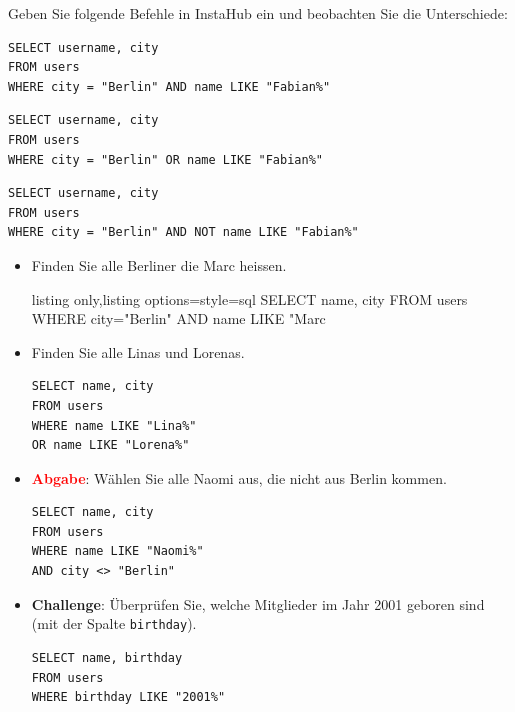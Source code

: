 \begin{myexample}
Geben Sie folgende Befehle in InstaHub ein und beobachten Sie die Unterschiede:

\begin{lstlisting}[style=sql]
SELECT username, city 
FROM users 
WHERE city = "Berlin" AND name LIKE "Fabian%"
\end{lstlisting}

\begin{lstlisting}[style=sql]
SELECT username, city 
FROM users 
WHERE city = "Berlin" OR name LIKE "Fabian%"
\end{lstlisting}

\begin{lstlisting}[style=sql]
SELECT username, city 
FROM users 
WHERE city = "Berlin" AND NOT name LIKE "Fabian%"
\end{lstlisting}
\end{myexample}

\begin{aufgabe}{}
\begin{itemize}
\item Finden Sie alle Berliner die Marc heissen.
\begin{myantwort}
\begin{tcblisting}{listing only,listing options={style=sql}}
SELECT name, city
FROM users
WHERE city="Berlin" AND name LIKE "Marc%
\end{tcblisting}
\end{myantwort}
\item Finden Sie alle Linas und Lorenas.
\begin{myantwort}
\begin{lstlisting}[style=sql]
SELECT name, city
FROM users
WHERE name LIKE "Lina%"
OR name LIKE "Lorena%"
\end{lstlisting}
\end{myantwort}
\item {} \textcolor{red}{\textbf{Abgabe}}: Wählen Sie alle Naomi aus, die nicht aus Berlin kommen.
\begin{myantwort}
\begin{lstlisting}[style=sql]
SELECT name, city
FROM users
WHERE name LIKE "Naomi%"
AND city <> "Berlin"
\end{lstlisting}
\end{myantwort}
\item \textbf{Challenge}: Überprüfen Sie, welche Mitglieder im Jahr 2001 geboren sind (mit der Spalte \texttt{birthday}).
\begin{myantwort}
\begin{lstlisting}[style=sql]
SELECT name, birthday
FROM users
WHERE birthday LIKE "2001%"
\end{lstlisting}
\end{myantwort}
\end{itemize}
\end{aufgabe}

